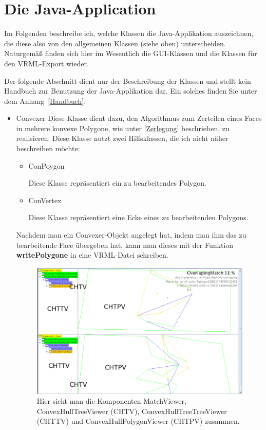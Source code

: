 \section{Die Java-Application }\label{java}
Im Folgenden  beschreibe ich, welche Klassen die Java-Applikation auszeichnen, die diese also von den allgemeinen Klassen (siehe oben) unterscheiden. Naturgemäß finden sich hier im Wesentlich die GUI-Klassen und die Klassen für den VRML-Export wieder.

Der folgende Abschnitt dient nur der Beschreibung der Klassen und stellt kein Handbuch zur Benutzung der Java-Applikation dar. Ein solches finden Sie unter dem Anhang~\ref{Handbuch}.

\begin{itemize}
\item Convexer
Diese Klasse dient dazu, den Algorithmus zum Zerteilen eines Faces in mehrere konvexe Polygone, wie unter \ref{Zerlegung} beschrieben, zu realisieren. Diese Klasse nutzt zwei Hilfsklassen, die ich nicht näher beschreiben möchte:
\begin{itemize}

\item ConPoygon

Diese Klasse repräsentiert ein zu bearbeitendes Polygon.
\item ConVertex

Diese Klasse repräsentiert eine Ecke eines zu bearbeitenden Polygons.
\end{itemize}

Nachdem man ein Convexer-Objekt angelegt hat, indem man ihm das zu bearbeitende Face übergeben hat, kann man dieses mit der Funktion \textbf{writePolygone} in eine VRML-Datei schreiben.

\begin{figure}
	\centering
	\includegraphics[scale=0.8]{MatchViewer.eps}
	\caption[Ein MatchViewer mit allen Unteklassen] {Hier sieht man die Komponenten MatchViewer, ConvexHullTreeViewer (CHTV), ConvexHullTreeTreeViewer (CHTTV) und ConvexHullPolygonViewer (CHTPV) zusammen.}
	\label{fig:MatchViewer}
\end{figure}


\end{itemize}
